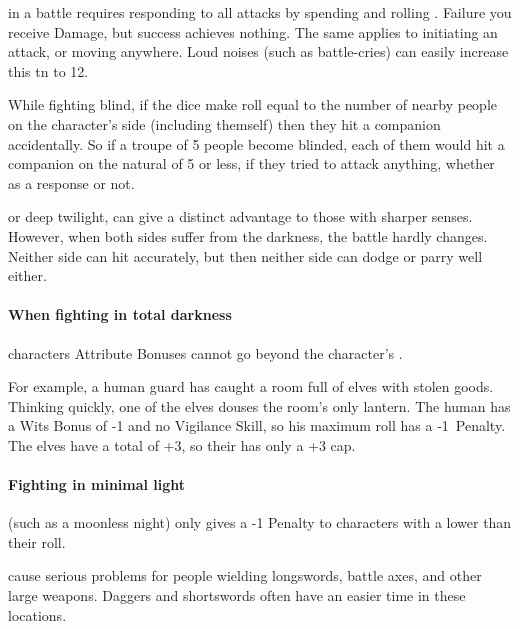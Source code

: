 \begin{multicols}{2}
in a battle requires responding to all attacks by spending  and rolling .
Failure you receive Damage, but success achieves nothing.
The same applies to initiating an attack, or moving anywhere.
Loud noises (such as battle-cries) can easily increase this \gls{tn} to 12.

While fighting blind, if the dice make  roll equal to the number of nearby people on the character's side (including themself) then they hit a companion accidentally.
So if a troupe of 5 people become blinded, each of them would hit a companion on the \gls{natural} of 5 or less, if they tried to attack anything, whether as a response or not.

\label{darkness}
or deep twilight, can give a distinct advantage to those with sharper senses.
However, when both sides suffer from the darkness, the battle hardly changes.
Neither side can hit accurately, but then neither side can dodge or parry well either.

\paragraph*{When fighting in total darkness}
characters Attribute Bonuses cannot go beyond the character's .

\begin{exampletext}
  For example, a human guard has caught a room full of elves with stolen goods.
  Thinking quickly, one of the elves douses the room's only lantern.
  The human has a Wits Bonus of -1 and no Vigilance Skill, so his maximum roll has a -1~Penalty.
  The elves have a total  of +3, so their  has only a +3 cap.
\end{exampletext}

\paragraph{Fighting in minimal light}
(such as a moonless night)
only gives a -1 Penalty to characters with a  lower than their roll.

cause serious problems for people wielding longswords, battle axes, and other large weapons.
Daggers and shortswords often have an easier time in these locations.


\end{multicols}
